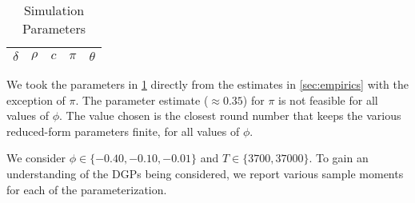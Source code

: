 \documentclass[11pt, letterpaper, twoside]{article}
\begin{document}
\begin{table}[htb]
  
  \centering
  \caption{Simulation Parameters}
  \label{tbl:simulationParameters}
  
  \begin{tabularx}{.8\textwidth}{X X c X X}

    \toprule
    $\delta$  & $\rho$  & $c$  & $\pi$ & $\theta$ \\
    \midrule
    \bottomrule
%
  \end{tabularx}

\end{table}

We took the parameters in \cref{tbl:simulationParameters} directly from the estimates in \cref{sec:empirics} with the exception of $\pi$. The parameter estimate ($\approx 0.35$) for $\pi$ is not feasible for all values of $\phi$.
The value chosen is the closest round number that keeps the various reduced-form parameters finite, for all values of $\phi$.

We consider $\phi \in \lbrace -0.40, -0.10, -0.01 \rbrace$ and $T \in \lbrace 3700, 37000 \rbrace$. To gain an understanding of the DGPs being considered, we report various sample moments for each of the parameterization.


  

  
\end{document}
